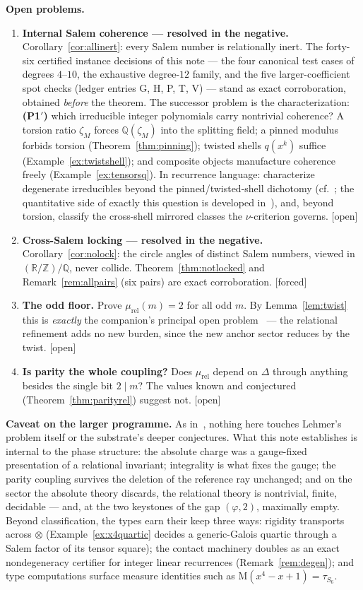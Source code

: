 \documentclass[11pt]{article}
\theoremstyle{plain}
\theoremstyle{definition}
\theoremstyle{remark}
\newcommand{\Q}{\mathbb{Q}}
\newcommand{\Z}{\mathbb{Z}}
\newcommand{\R}{\mathbb{R}}
\newcommand{\Mah}{\mathrm{M}}
\newcommand{\F}{\textnormal{[forced]}}
\newcommand{\Op}{\textnormal{[open]}}
\begin{document}
\medskip
\noindent\textbf{Open problems.}
\begin{enumerate}
\item[(P1)] \textbf{Internal Salem coherence --- resolved in the negative.}
Corollary~\ref{cor:allinert}: every Salem number is relationally inert.
The forty-six certified instance decisions of this note --- the four
canonical test cases of degrees $4$--$10$, the exhaustive degree-$12$
family, and the five larger-coefficient spot checks (ledger entries G, H,
P, T, V) --- stand as exact corroboration, obtained \emph{before} the
theorem. The successor problem is the characterization: \textbf{(P1$'$)}
which irreducible integer polynomials carry nontrivial coherence? A torsion
ratio $\zeta_M$ forces $\Q(\zeta_M)$ into the splitting field; a pinned
modulus forbids torsion (Theorem~\ref{thm:pinning}); twisted shells
$q(x^k)$ suffice (Example~\ref{ex:twistshell}); and composite objects
manufacture coherence freely (Example~\ref{ex:tensorsq}). In recurrence
language: characterize degenerate irreducibles beyond the
pinned/twisted-shell dichotomy (cf.~\cite{EPSW}; the quantitative side of
exactly this question is developed in~\cite{Dub2012}), and, beyond torsion,
classify the cross-shell mirrored classes the $\nu$-criterion governs. \Op
\item[(P2)] \textbf{Cross-Salem locking --- resolved in the negative.}
Corollary~\ref{cor:nolock}: the circle angles of distinct Salem numbers,
viewed in $(\R/\Z)/\Q$, never collide. Theorem~\ref{thm:notlocked} and
Remark~\ref{rem:allpairs} (six pairs) are exact corroboration. \F
\item[(P3)] \textbf{The odd floor.} Prove $\mu_{\mathrm{rel}}(m)=2$ for all odd
$m$. By Lemma~\ref{lem:twist} this is \emph{exactly} the companion's principal
open problem~\cite[\S8]{CMC} --- the relational refinement adds no new burden,
since the new anchor sector reduces by the twist. \Op
\item[(P4)] \textbf{Is parity the whole coupling?} Does
$\mu_{\mathrm{rel}}$ depend on $\Delta$ through anything besides the single bit
$2\mid m$? The values known and conjectured (Theorem~\ref{thm:parityrel})
suggest not. \Op
\end{enumerate}

\medskip
\noindent\textbf{Caveat on the larger programme.} As in~\cite{CMC}, nothing here
touches Lehmer's problem itself or the substrate's deeper conjectures. What this
note establishes is internal to the phase structure: the absolute charge was a
gauge-fixed presentation of a relational invariant; integrality is what fixes
the gauge; the parity coupling survives the deletion of the reference ray
unchanged; and on the sector the absolute theory discards, the relational
theory is nontrivial, finite, decidable --- and, at the two keystones of the gap
$(\varphi,2)$, maximally empty. Beyond classification, the types earn their
keep three ways: rigidity transports across $\otimes$
(Example~\ref{ex:x4quartic} decides a generic-Galois quartic through a
Salem factor of its tensor square); the contact machinery doubles as an
exact nondegeneracy certifier for integer linear recurrences
(Remark~\ref{rem:degen}); and type computations surface measure identities
such as $\Mah(x^4-x+1)=\tau_{S_6}$.
\end{document}
